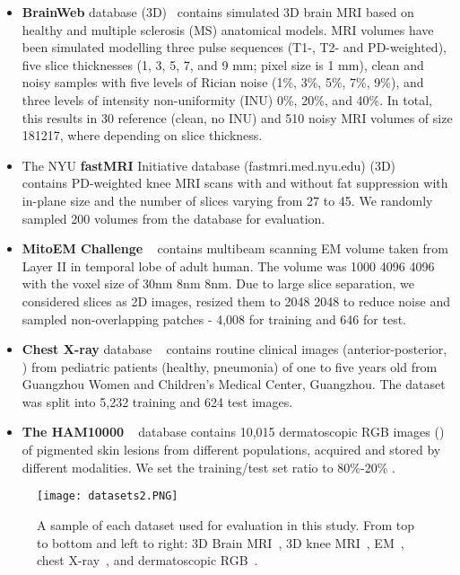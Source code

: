 \documentclass[journal,twoside,web]{ieeecolor}
\begin{document}
\begin{itemize}
    \item \textbf{BrainWeb} database (3D)~\cite{cocosco1997brainweb} contains simulated 3D brain MRI based on healthy and multiple sclerosis (MS) anatomical models. MRI volumes have been simulated modelling three pulse sequences (T1-, T2- and PD-weighted), five slice thicknesses (1, 3, 5, 7, and 9 mm; pixel size is 1 mm), clean and noisy samples with five levels of Rician noise (1\%, 3\%, 5\%, 7\%, 9\%), and three levels of intensity non-uniformity (INU) 0\%, 20\%, and 40\%. In total, this results in 30 reference (clean, no INU) and 510 noisy MRI volumes of size 181217, where  depending on slice thickness. 
    \item The NYU \textbf{fastMRI} Initiative database (fastmri.med.nyu.edu) (3D) ~\cite{zbontar2018fastmri} contains PD-weighted knee MRI scans with and without fat suppression with in-plane size  and the number of slices varying from 27 to 45. We randomly sampled 200 volumes from the database for evaluation.
    \item \textbf{MitoEM Challenge} ~\cite{isbi2021} contains multibeam scanning EM volume taken from Layer II in temporal lobe of adult human. The volume was 1000  4096  4096  with the voxel size of 30nm  8nm  8nm. Due to large slice separation, we considered slices as 2D images, resized them to 2048  2048 to reduce noise and sampled  non-overlapping patches - 4,008 for training and 646 for test.
    \item \textbf{Chest X-ray} database ~\cite{kermany2018identifying} contains routine clinical images (anterior-posterior, ) from pediatric patients (healthy, pneumonia) of one to five years old from Guangzhou Women and Children’s Medical Center, Guangzhou. The dataset was split into 5,232 training and 624 test images. 
    \item \textbf{The HAM10000 }~\cite{DBW86T_2018} database contains 10,015 dermatoscopic RGB images () of pigmented skin lesions from different populations, acquired and stored by different modalities. We set the training/test set ratio to 80\%-20\% .
\end{itemize}

\begin{figure}\centering
    \texttt{[image: datasets2.PNG]}
\caption{A sample of each dataset used for evaluation in this study. From top to bottom and left to right: 3D Brain MRI~\cite{cocosco1997brainweb}, 3D knee MRI~\cite{zbontar2018fastmri}, EM~\cite{isbi2021}, chest X-ray~\cite{kermany2018identifying}, and dermatoscopic RGB~\cite{DBW86T_2018}.}
\label{fig:datasets}
\end{figure} 
\end{document}
